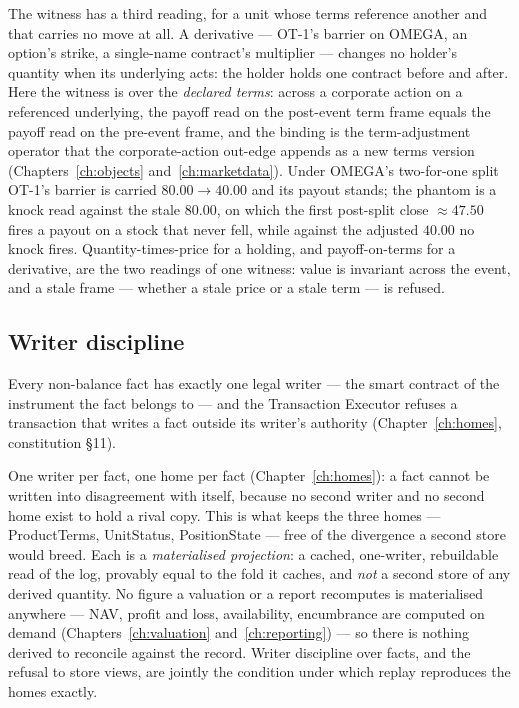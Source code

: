 The witness has a third reading, for a unit whose terms reference another and that carries
no move at all. A derivative --- OT-1's barrier on OMEGA, an option's strike, a single-name
contract's multiplier --- changes no holder's quantity when its underlying acts: the holder
holds one contract before and after. Here the witness is over the \emph{declared terms}:
across a corporate action on a referenced underlying, the payoff read on the post-event term
frame equals the payoff read on the pre-event frame, and the binding is the term-adjustment
operator that the corporate-action out-edge appends as a new terms version
(Chapters~\ref{ch:objects} and~\ref{ch:marketdata}). Under OMEGA's two-for-one split OT-1's
barrier is carried $80.00 \rightarrow 40.00$ and its  payout stands; the
phantom is a knock read against the stale $80.00$, on which the first post-split close
$\approx 47.50$ fires a payout on a stock that never fell, while against the adjusted $40.00$
no knock fires. Quantity-times-price for a holding, and payoff-on-terms for a derivative, are
the two readings of one witness: value is invariant across the event, and a stale frame ---
whether a stale price or a stale term --- is refused.

\subsection{Writer discipline}

\begin{invariant}\label{inv:writer}
Every non-balance fact has exactly one legal writer --- the smart contract of the
instrument the fact belongs to --- and the Transaction Executor refuses a
transaction that writes a fact outside its writer's authority
(Chapter~\ref{ch:homes}, constitution \S 11).
\end{invariant}

One writer per fact, one home per fact (Chapter~\ref{ch:homes}): a fact cannot be
written into disagreement with itself, because no second writer and no second home
exist to hold a rival copy. This is what keeps the three homes ---
ProductTerms, UnitStatus, PositionState --- free of the divergence a second store
would breed. Each is a \emph{materialised projection}: a cached, one-writer,
rebuildable read of the log, provably equal to the fold it caches, and \emph{not}
a second store of any derived quantity. No figure a valuation or a report
recomputes is materialised anywhere --- NAV, profit and loss, availability,
encumbrance are computed on demand (Chapters~\ref{ch:valuation}
and~\ref{ch:reporting}) --- so there is nothing derived to reconcile against the
record. Writer discipline over facts, and the refusal to store views, are jointly
the condition under which replay reproduces the homes exactly.

